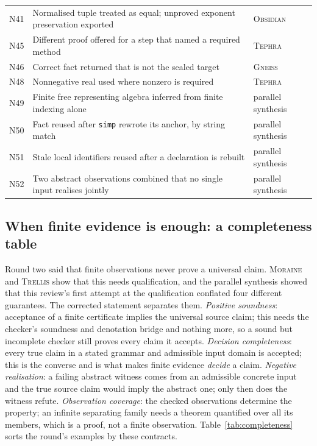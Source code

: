 \documentclass[11pt,a4paper]{article}
\newcommand{\code}[1]{\nolinkurl{#1}}
\newcommand{\Gn}{\textsc{Gneiss}}
\newcommand{\Mr}{\textsc{Moraine}}
\newcommand{\Ob}{\textsc{Obsidian}}
\newcommand{\Tp}{\textsc{Tephra}}
\newcommand{\Tr}{\textsc{Trellis}}
\theoremstyle{definition}
\begin{document}
\begin{table}[htbp]
\begin{tabularx}{\textwidth}{@{}L{8mm}L{86mm}L{54mm}@{}}
N41 & Normalised tuple treated as equal; unproved exponent preservation exported & \Ob\\
N45 & Different proof offered for a step that named a required method & \Tp\\
N46 & Correct fact returned that is not the sealed target & \Gn\\
N48 & Nonnegative real used where nonzero is required & \Tp\\
N49 & Finite free representing algebra inferred from finite indexing alone & parallel synthesis\\
N50 & Fact reused after \code{simp} rewrote its anchor, by string match & parallel synthesis\\
N51 & Stale local identifiers reused after a declaration is rebuilt & parallel synthesis\\
N52 & Two abstract observations combined that no single input realises jointly & parallel synthesis\\
\bottomrule
\end{tabularx}
\end{table}

\subsection{When finite evidence is enough: a completeness table}\label{sec:completeness}
Round two said that finite observations never prove a universal claim. \Mr{} and \Tr{} show that this needs qualification, and the parallel synthesis showed that this review's first attempt at the qualification conflated four different guarantees. The corrected statement separates them. \emph{Positive soundness}: acceptance of a finite certificate implies the universal source claim; this needs the checker's soundness and denotation bridge and nothing more, so a sound but incomplete checker still proves every claim it accepts. \emph{Decision completeness}: every true claim in a stated grammar and admissible input domain is accepted; this is the converse and is what makes finite evidence \emph{decide} a claim. \emph{Negative realisation}: a failing abstract witness comes from an admissible concrete input and the true source claim would imply the abstract one; only then does the witness refute. \emph{Observation coverage}: the checked observations determine the property; an infinite separating family needs a theorem quantified over all its members, which is a proof, not a finite observation. Table~\ref{tab:completeness} sorts the round's examples by these contracts.
\end{document}
